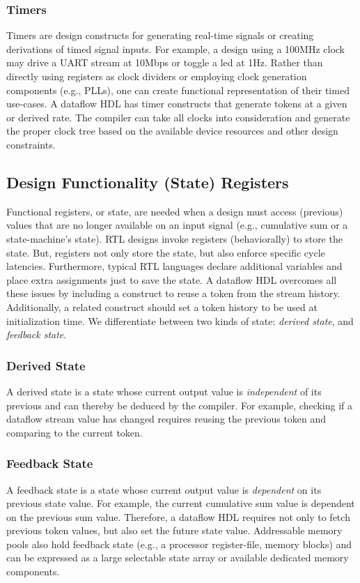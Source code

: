 \subsubsection{Timers}
Timers are design constructs for generating real-time signals or creating derivations of timed signal inputs. For example, a design using a 100MHz clock may drive a UART stream at 10Mbps or toggle a led at 1Hz. Rather than directly using registers as clock dividers or employing clock generation components (e.g., PLLs), one can create functional representation of their timed use-cases. A dataflow HDL has timer constructs that generate tokens at a given or derived rate. The compiler can take all clocks into consideration and generate the proper clock tree based on the available device resources and other design constraints. 

\subsection{Design Functionality (State) Registers}
Functional registers, or state, are needed when a design must access (previous) values that are no longer available on an input signal (e.g., cumulative sum or a state-machine's state). RTL designs invoke registers (behaviorally) to store the state. But, registers not only store the state, but also enforce specific cycle latencies. Furthermore, typical RTL languages declare additional variables and place extra assignments just to save the state. A dataflow HDL overcomes all these issues by including a construct to reuse a token from the stream history. Additionally, a related construct should set a token history to be used at initialization time.
We differentiate between two kinds of state: \textit{derived state}, and \textit{feedback state}. 


\subsubsection{Derived State} 
A derived state is a state whose current output value is \textit{independent} of its previous and can thereby be deduced by the compiler. For example, checking if a dataflow stream value has changed requires reusing the previous token and comparing to the current token. 

\subsubsection{Feedback State} 
A feedback state is a state whose current output value is \textit{dependent} on its previous state value. For example, the current cumulative sum value is dependent on the previous sum value. Therefore, a dataflow HDL requires not only to fetch previous token values, but also set the future state value. Addressable memory pools also hold feedback state (e.g., a processor register-file, memory blocks) and can be expressed as a large selectable state array or available dedicated memory components.

